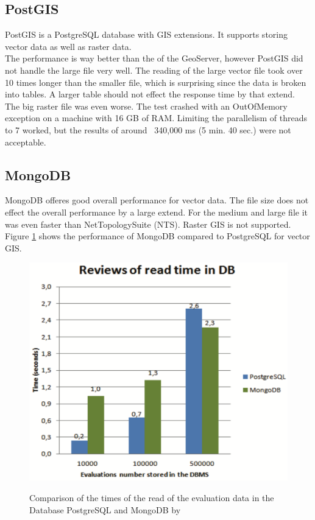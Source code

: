 \subsection{PostGIS}
PostGIS is a PostgreSQL database with GIS extensions. It supports storing vector data as well as raster data.\\
The performance is way better than the of the GeoServer, however PostGIS did not handle the large file very well. The reading of the large vector file took over 10 times longer than the smaller file, which is surprising since the data is broken into tables. A larger table should not effect the response time by that extend.\\
The big raster file was even worse. The test crashed with an OutOfMemory exception on a machine with 16 GB of RAM. Limiting the parallelism of threads to 7 worked, but the results of around ~340,000 ms (5 min. 40 sec.) were not acceptable.


\subsection{MongoDB}
MongoDB offeres good overall performance for vector data. The file size does not effect the overall performance by a large extend. For the medium and large file it was even faster than NetTopologySuite (NTS). Raster GIS is not supported.\\
Figure \ref{img:mongo-vs-postgres} shows the performance of MongoDB compared to PostgreSQL for vector GIS.

\begin{figure}[H]
	\centering
	\includegraphics[width=0.6\columnwidth]{res/mongo-vs-postgres}\\
	\caption[]{Comparison of the times of the read of the evaluation data in the Database PostgreSQL and MongoDB by \cite{Maia2016}}
	\label{img:mongo-vs-postgres}
\end{figure}

